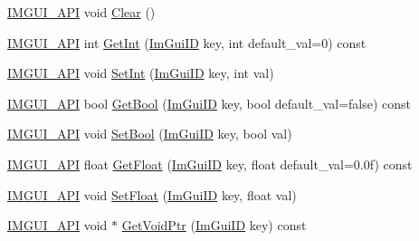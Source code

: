 \begin{DoxyCompactItemize}
\item 
\mbox{\hyperlink{imgui_8h_a43829975e84e45d1149597467a14bbf5}{I\+M\+G\+U\+I\+\_\+\+A\+PI}} void \mbox{\hyperlink{struct_im_gui_storage_a72ceecfbca3d08df8c2a232b77890c20}{Clear}} ()
\item 
\mbox{\hyperlink{imgui_8h_a43829975e84e45d1149597467a14bbf5}{I\+M\+G\+U\+I\+\_\+\+A\+PI}} int \mbox{\hyperlink{struct_im_gui_storage_ac86b64f5c69a15de6c6c326963eca64a}{Get\+Int}} (\mbox{\hyperlink{imgui_8h_a1785c9b6f4e16406764a85f32582236f}{Im\+Gui\+ID}} key, int default\+\_\+val=0) const
\item 
\mbox{\hyperlink{imgui_8h_a43829975e84e45d1149597467a14bbf5}{I\+M\+G\+U\+I\+\_\+\+A\+PI}} void \mbox{\hyperlink{struct_im_gui_storage_af83975ca841a9bd0e06a6ea0a41bf159}{Set\+Int}} (\mbox{\hyperlink{imgui_8h_a1785c9b6f4e16406764a85f32582236f}{Im\+Gui\+ID}} key, int val)
\item 
\mbox{\hyperlink{imgui_8h_a43829975e84e45d1149597467a14bbf5}{I\+M\+G\+U\+I\+\_\+\+A\+PI}} bool \mbox{\hyperlink{struct_im_gui_storage_a22d34ae6278f86468a3e7df8fbd1b632}{Get\+Bool}} (\mbox{\hyperlink{imgui_8h_a1785c9b6f4e16406764a85f32582236f}{Im\+Gui\+ID}} key, bool default\+\_\+val=false) const
\item 
\mbox{\hyperlink{imgui_8h_a43829975e84e45d1149597467a14bbf5}{I\+M\+G\+U\+I\+\_\+\+A\+PI}} void \mbox{\hyperlink{struct_im_gui_storage_ac5beee31a59b3f5294b41992717be7bf}{Set\+Bool}} (\mbox{\hyperlink{imgui_8h_a1785c9b6f4e16406764a85f32582236f}{Im\+Gui\+ID}} key, bool val)
\item 
\mbox{\hyperlink{imgui_8h_a43829975e84e45d1149597467a14bbf5}{I\+M\+G\+U\+I\+\_\+\+A\+PI}} float \mbox{\hyperlink{struct_im_gui_storage_a0f51ef327f7e548d003b0e006967c1eb}{Get\+Float}} (\mbox{\hyperlink{imgui_8h_a1785c9b6f4e16406764a85f32582236f}{Im\+Gui\+ID}} key, float default\+\_\+val=0.\+0f) const
\item 
\mbox{\hyperlink{imgui_8h_a43829975e84e45d1149597467a14bbf5}{I\+M\+G\+U\+I\+\_\+\+A\+PI}} void \mbox{\hyperlink{struct_im_gui_storage_ab531d90a0e5a1a2453e351c499149756}{Set\+Float}} (\mbox{\hyperlink{imgui_8h_a1785c9b6f4e16406764a85f32582236f}{Im\+Gui\+ID}} key, float val)
\item 
\mbox{\hyperlink{imgui_8h_a43829975e84e45d1149597467a14bbf5}{I\+M\+G\+U\+I\+\_\+\+A\+PI}} void $\ast$ \mbox{\hyperlink{struct_im_gui_storage_aaf87a98ede89da09113b0189f6d878ca}{Get\+Void\+Ptr}} (\mbox{\hyperlink{imgui_8h_a1785c9b6f4e16406764a85f32582236f}{Im\+Gui\+ID}} key) const

\end{DoxyCompactItemize}
